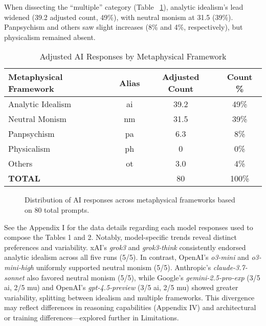 \documentclass[11pt]{article}
\begin{document}
When dissecting the ``multiple'' category (Table ~\ref{tab:adjusted}), analytic idealism's lead widened (39.2 adjusted count, 49\%), with neutral monism at 31.5 (39\%). Panpsychism and others saw slight increases (8\% and 4\%, respectively), but physicalism remained absent.

\begin{table}[ht!]
\centering
\caption{Adjusted AI Responses by Metaphysical Framework}
\label{tab:adjusted}
\begin{tabular}{lccc}
\toprule
\textbf{Metaphysical Framework} & \textbf{Alias} & \textbf{Adjusted Count} & \textbf{Count \%} \\
\midrule
Analytic Idealism & ai & 39.2 & 49\% \\
Neutral Monism    & nm & 31.5 & 39\% \\
Panpsychism       & pa & 6.3  & 8\%  \\
Physicalism       & ph & 0    & 0\%  \\
Others            & ot & 3.0  & 4\%  \\
\midrule
\textbf{TOTAL}    &    & 80 & 100\% \\
\bottomrule
\end{tabular}
\end{table}

\begin{figure}[ht!]
\centering
{}
\caption{Distribution of AI responses across metaphysical frameworks based on 80 total prompts.}
\label{fig:frameworks}
\end{figure}
\FloatBarrier

See the Appendix I for the data details regarding each model responses used to compose the Tables 1 and 2. Notably, model-specific trends reveal distinct preferences and variability. xAI's \textit{grok3} and \textit{grok3-think} consistently endorsed analytic idealism across all five runs (5/5). In contrast, OpenAI's \textit{o3-mini} and \textit{o3-mini-high} uniformly supported neutral monism (5/5). Anthropic's \textit{claude-3.7-sonnet} also favored neutral monism (5/5), while Google's \textit{gemini-2.5-pro-exp} (3/5 ai, 2/5 mu) and OpenAI's \textit{gpt-4.5-preview} (3/5 ai, 2/5 mu) showed greater variability, splitting between idealism and multiple frameworks. This divergence may reflect differences in reasoning capabilities (Appendix IV) and architectural or training differences—explored further in Limitations.
\end{document}
